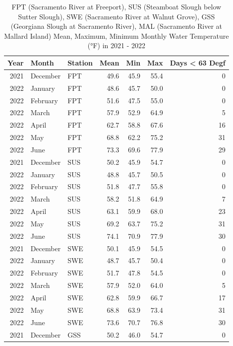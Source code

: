 \documentclass[
]{book}
\theoremstyle{definition}
\theoremstyle{definition}
\theoremstyle{definition}
\theoremstyle{definition}
\theoremstyle{remark}
\begin{document}
\begin{table}
\centering
\caption{FPT (Sacramento River at Freeport), SUS (Steamboat Slough below Sutter Slough), SWE (Sacramento River at Walnut Grove), GSS (Georgiana Slough at Sacramento River), MAL (Sacramento River at Mallard Island) Mean, Maximum, Minimum Monthly Water Temperature (°F) in 2021 - 2022}
\centering
\begin{tabular}[t]{rllrrrr}
\hline
Year & Month & Station & Mean & Min & Max & Days < 63 Degf\\
\hline
2021 & December & FPT & 49.6 & 45.9 & 55.4 & 0\\
\hline
2022 & January & FPT & 48.6 & 45.7 & 50.0 & 0\\
\hline
2022 & February & FPT & 51.6 & 47.5 & 55.0 & 0\\
\hline
2022 & March & FPT & 57.9 & 52.9 & 64.9 & 5\\
\hline
2022 & April & FPT & 62.7 & 58.8 & 67.6 & 16\\
\hline
2022 & May & FPT & 68.8 & 62.2 & 75.2 & 31\\
\hline
2022 & June & FPT & 73.3 & 69.6 & 77.9 & 29\\
\hline
2021 & December & SUS & 50.2 & 45.9 & 54.7 & 0\\
\hline
2022 & January & SUS & 48.8 & 45.7 & 50.5 & 0\\
\hline
2022 & February & SUS & 51.8 & 47.7 & 55.8 & 0\\
\hline
2022 & March & SUS & 58.2 & 51.8 & 64.9 & 7\\
\hline
2022 & April & SUS & 63.1 & 59.9 & 68.0 & 23\\
\hline
2022 & May & SUS & 69.2 & 63.7 & 75.2 & 31\\
\hline
2022 & June & SUS & 74.1 & 70.9 & 77.9 & 30\\
\hline
2021 & December & SWE & 50.1 & 45.9 & 54.5 & 0\\
\hline
2022 & January & SWE & 48.7 & 45.7 & 50.4 & 0\\
\hline
2022 & February & SWE & 51.7 & 47.8 & 54.5 & 0\\
\hline
2022 & March & SWE & 57.9 & 52.0 & 64.0 & 5\\
\hline
2022 & April & SWE & 62.8 & 59.9 & 66.7 & 17\\
\hline
2022 & May & SWE & 68.8 & 63.9 & 73.4 & 31\\
\hline
2022 & June & SWE & 73.6 & 70.7 & 76.8 & 30\\
\hline
2021 & December & GSS & 50.2 & 46.0 & 54.7 & 0\\

\end{tabular}
\end{table}
\end{document}
